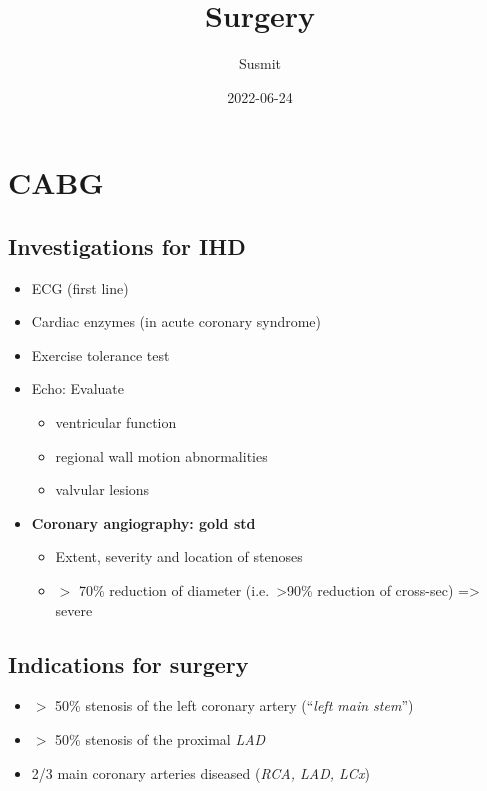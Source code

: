 \documentclass[
  14pt,
]{extarticle}
\title{Surgery}
\author{Susmit}
\date{2022-06-24}
\providecommand{\tightlist}{%
  \setlength{\itemsep}{0pt}\setlength{\parskip}{0pt}}
\begin{document}
\maketitle

{
\setcounter{tocdepth}{2}
\tableofcontents
}
\pagebreak

\hypertarget{cabg}{%
\section{CABG}\label{cabg}}

\hypertarget{investigations-for-ihd}{%
\subsection{Investigations for IHD}\label{investigations-for-ihd}}

\begin{itemize}
\tightlist
\item
  ECG (first line)
\item
  Cardiac enzymes (in acute coronary syndrome)
\item
  Exercise tolerance test
\item
  Echo: Evaluate

  \begin{itemize}
  \tightlist
  \item
    ventricular function
  \item
    regional wall motion abnormalities
  \item
    valvular lesions
  \end{itemize}
\item
  \textbf{Coronary angiography: gold std}

  \begin{itemize}
  \tightlist
  \item
    Extent, severity and location of stenoses
  \item
    \(>\) 70\% reduction of diameter (i.e.~\textgreater90\% reduction of
    cross-sec) =\textgreater{} severe
  \end{itemize}
\end{itemize}

\hypertarget{indications-for-surgery}{%
\subsection{Indications for surgery}\label{indications-for-surgery}}

\begin{itemize}
\tightlist
\item
  \(>\) 50\% stenosis of the left coronary artery (``\emph{left main
  stem}'')
\item
  \(>\) 50\% stenosis of the proximal \emph{LAD}
\item
  2/3 main coronary arteries diseased (\emph{RCA, LAD, LCx})
\end{itemize}
\end{document}
